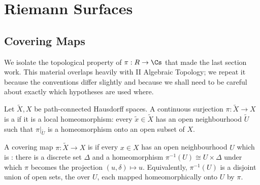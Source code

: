 \section{Riemann Surfaces}

\subsection{Covering Maps}

We isolate the topological property of $\pi : R \to \Cs$ that made the last section work.
This material overlaps heavily with II Algebraic Topology; we repeat it because the
conventions differ slightly and because we shall need to be careful about exactly which
hypotheses are used where.

\begin{definition}
	Let $\tilde X, X$ be path-connected Hausdorff spaces. A continuous surjection
	$\pi : \tilde X \to X$ is a  if it is a local homeomorphism: every
	$\tilde x \in \tilde X$ has an open neighbourhood $\tilde U$ such that $\pi|_{\tilde U}$
	is a homeomorphism onto an open subset of $X$.
\end{definition}

\begin{definition}
	A covering map $\pi : \tilde X \to X$ is  if every $x \in X$ has an open
	neighbourhood $U$ which is : there is a discrete set $\Delta$ and
	a homeomorphism $\pi^{-1}(U) \cong U \times \Delta$ under which $\pi$ becomes the
	projection $(u, \delta) \mapsto u$. Equivalently, $\pi^{-1}(U)$ is a disjoint union of
	open sets, the  over $U$, each mapped homeomorphically onto $U$ by $\pi$.
\end{definition}

\begin{center}
\end{center}


